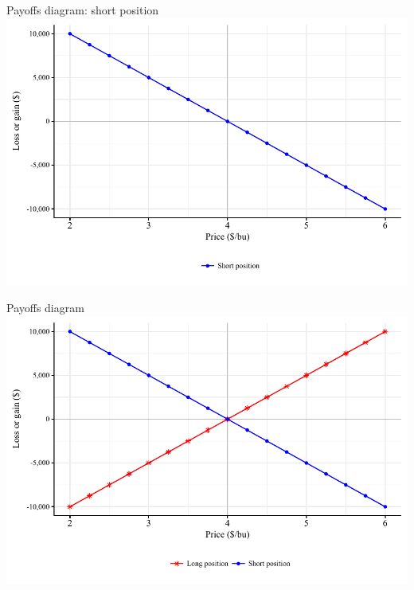 \documentclass[table,xcolor=pdftex,dvipsnames]{beamer}\usepackage[]{graphicx}\usepackage[]{color}
\makeatletter
\def\maxwidth{ %
  \ifdim\Gin@nat@width>\linewidth
    \linewidth
  \else
    \Gin@nat@width
  \fi
}
\newenvironment{knitrout}{}{} %
\makeatother
\begin{document}
\begin{frame}{Payoffs diagram: short position}
\begin{knitrout}
\color{fgcolor}
\includegraphics[width=\maxwidth]{figure/figure_short-1} 

\end{knitrout}
\end{frame}


\begin{frame}{Payoffs diagram}
\begin{knitrout}
\color{fgcolor}
\includegraphics[width=\maxwidth]{figure/figure_position-1} 

\end{knitrout}
\end{frame}
\end{document}
